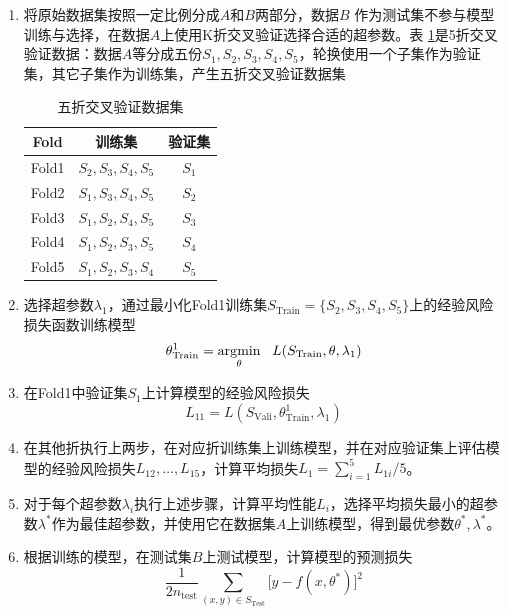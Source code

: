 \begin{enumerate}[Step 1. ]
  \item 将原始数据集按照一定比例分成$A$和$B$两部分，数据$B$ 作为测试集不参与模型训练与选择，在数据$A$上使用K折交叉验证选择合适的超参数。表
  \ref{tbl:fivefoldcv}是5折交叉验证数据：数据$A$等分成五份$S_1, S_2, S_3, S_4, S_5$，轮换使用一个子集作为验证集，其它子集作为训练集，产生五折交叉验证数据集
    \begin{table}[htbp]
    \caption{五折交叉验证数据集}
    \label{tbl:fivefoldcv}
    \centering
    \begin{tabular}{c|c|c}
      \hline
      Fold & 训练集 & 验证集\\
      \hline
      Fold1 & $S_2,S_3,S_4,S_5$ & $S_1$ \\
      Fold2 & $S_1,S_3,S_4,S_5$ & $S_2$ \\
      Fold3 & $S_1,S_2,S_4,S_5$ & $S_3$ \\
      Fold4 & $S_1,S_2,S_3,S_5$ & $S_4$ \\
      Fold5 & $S_1,S_2,S_3,S_4$ & $S_5$ \\
      \hline
    \end{tabular}
    \end{table}
  \item 选择超参数$\lambda_1$，通过最小化Fold1训练集$S_\textrm{Train}=\{S_2,S_3,S_4,S_5\}$上的经验风险损失函数训练模型
      \begin{equation}
        \theta_\textrm{Train}^1 = \operatorname*{\mathrm{\arg\!\min}}\limits_{\theta}~~L(S_\textrm{Train}, \theta, \lambda_1)
      \end{equation}
  \item 在Fold1中验证集$S_1$上计算模型的经验风险损失
   \begin{equation}
      L_{11} = L(S_\textrm{Vali}, \theta_\textrm{Train}^1, \lambda_1)
   \end{equation}
  \item 在其他折执行上两步，在对应折训练集上训练模型，并在对应验证集上评估模型的经验风险损失$L_{12},\ldots,L_{15}$，计算平均损失$L_1=\sum\limits_{i=1}^5 L_{1i}/5$。
  \item 对于每个超参数$\lambda_i$执行上述步骤，计算平均性能$L_i$，选择平均损失最小的超参数$\lambda^*$作为最佳超参数，并使用它在数据集$A$上训练模型，得到最优参数$\theta^*,\lambda^*$。
  \item 根据训练的模型，在测试集$B$上测试模型，计算模型的预测损失
  \begin{equation}
    \frac{1}{2n_\textrm{test}} \sum\limits_{(x,y)\in S_\textrm{Test}} \big[y - f(x, \theta^*)\big]^2
  \end{equation}
\end{enumerate}


